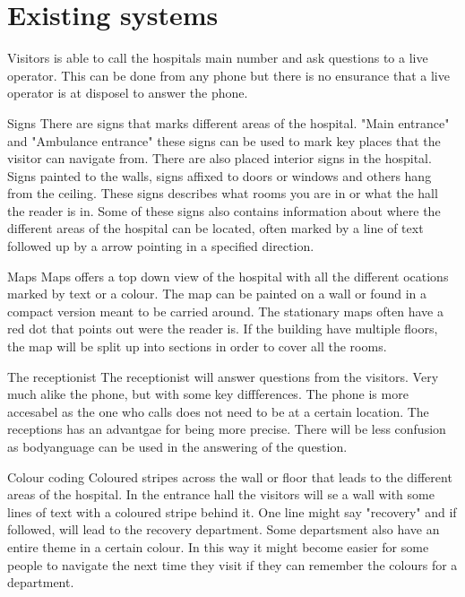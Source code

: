 \section{Existing systems} %
\label{sec:existing_systems}


Visitors is able to call the hospitals main number and ask questions to a live operator. This can be done from any phone but there is no ensurance that a live operator is at disposel to answer the phone.

Signs
There are signs that marks different areas of the hospital. "Main entrance" and "Ambulance entrance" these signs can be used to mark key places that the visitor can navigate from.
There are also placed interior signs in the hospital. Signs painted to the walls, signs affixed to doors or windows and others hang from the ceiling. These signs describes what rooms you are in or what the hall the reader is in. Some of these signs also contains information about where the different areas of the hospital can be located, often marked by a line of text followed up by a arrow pointing in a specified direction.   

Maps
Maps offers a top down view of the hospital with all the different ocations marked by text or a colour. The map can be painted on a wall or found in a compact version meant to be carried around. The stationary maps often have a red dot that points out were the reader is. If the building have multiple floors, the map will be split up into sections in order to cover all the rooms.

The receptionist
The receptionist will answer questions from the visitors. Very much alike the phone, but with some key diffferences. The phone is more accesabel as the one who calls does not need to be at a certain location. The receptions has an advantgae for being more precise. There will be less confusion as bodyanguage can be used in the answering of the question.

Colour coding
Coloured stripes across the wall or floor that leads to the different areas of the hospital. In the entrance hall the visitors will se a wall with some lines of text with a coloured stripe behind it. One line might say "recovery" and if followed, will lead to the recovery department. Some departsment also have an entire theme in a certain colour. In this way it might become easier for some people to navigate the next time they visit if they can remember the colours for a department. 

